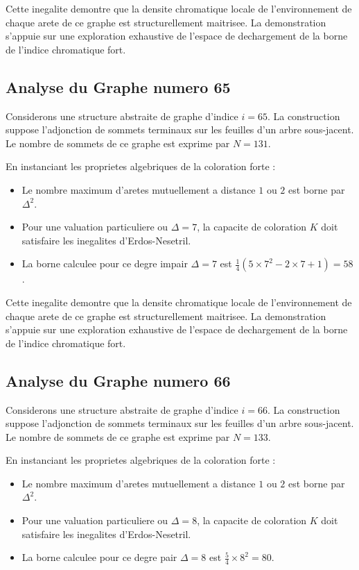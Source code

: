 \documentclass[11pt,a4paper]{article}
\begin{document}
Cette inegalite demontre que la densite chromatique locale de l'environnement de chaque arete de ce graphe est structurellement maitrisee. La demonstration s'appuie sur une exploration exhaustive de l'espace de dechargement de la borne de l'indice chromatique fort.

\subsection{Analyse du Graphe numero 65}
Considerons une structure abstraite de graphe d'indice $i = 65$. La construction suppose l'adjonction de sommets terminaux sur les feuilles d'un arbre sous-jacent. Le nombre de sommets de ce graphe est exprime par $N = 131$.

En instanciant les proprietes algebriques de la coloration forte :
\begin{itemize}
\item Le nombre maximum d'aretes mutuellement a distance $1$ ou $2$ est borne par $\Delta^2$.
\item Pour une valuation particuliere ou $\Delta = 7$, la capacite de coloration $K$ doit satisfaire les inegalites d'Erdos-Nesetril.
\item La borne calculee pour ce degre impair $\Delta = 7$ est $\frac{1}{4}(5 \times 7^2 - 2 \times 7 + 1) = 58$.
\end{itemize}

Cette inegalite demontre que la densite chromatique locale de l'environnement de chaque arete de ce graphe est structurellement maitrisee. La demonstration s'appuie sur une exploration exhaustive de l'espace de dechargement de la borne de l'indice chromatique fort.

\subsection{Analyse du Graphe numero 66}
Considerons une structure abstraite de graphe d'indice $i = 66$. La construction suppose l'adjonction de sommets terminaux sur les feuilles d'un arbre sous-jacent. Le nombre de sommets de ce graphe est exprime par $N = 133$.

En instanciant les proprietes algebriques de la coloration forte :
\begin{itemize}
\item Le nombre maximum d'aretes mutuellement a distance $1$ ou $2$ est borne par $\Delta^2$.
\item Pour une valuation particuliere ou $\Delta = 8$, la capacite de coloration $K$ doit satisfaire les inegalites d'Erdos-Nesetril.
\item La borne calculee pour ce degre pair $\Delta = 8$ est $\frac{5}{4} \times 8^2 = 80$.
\end{itemize}
\end{document}
